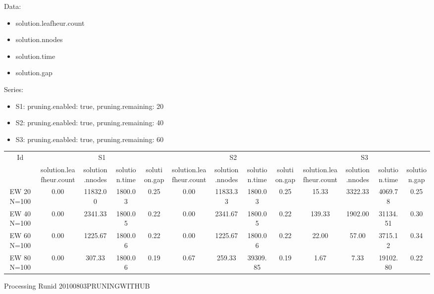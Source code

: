 \documentclass[landscape, 12pt]{report}
\begin{document}
Data:
\begin{itemize}
\item solution.leafheur.count
\item solution.nnodes
\item solution.time
\item solution.gap
\end{itemize}
Series:
\begin{itemize}
\item S1: pruning.enabled: true, pruning.remaining: 20
\item S2: pruning.enabled: true, pruning.remaining: 40
\item S3: pruning.enabled: true, pruning.remaining: 60
\end{itemize}
\begin{tabular}{|c|cccc|cccc|cccc|}
\hline
\multicolumn{1}{|c|}{Id} & \multicolumn{4}{|c|}{S1} & \multicolumn{4}{|c|}{S2} & \multicolumn{4}{|c|}{S3}
\\
 & solution.leafheur.count & solution.nnodes & solution.time & solution.gap & solution.leafheur.count & solution.nnodes & solution.time & solution.gap & solution.leafheur.count & solution.nnodes & solution.time & solution.gap
\\
\hline
EW 20 N=100 & 0.00 & 11832.00 & 1800.03 & 0.25 & 0.00 & 11833.33 & 1800.03 & 0.25 & 15.33 & 3322.33 & 4069.78 & 0.25
\\
EW 40 N=100 & 0.00 & 2341.33 & 1800.05 & 0.22 & 0.00 & 2341.67 & 1800.05 & 0.22 & 139.33 & 1902.00 & 31134.51 & 0.30
\\
EW 60 N=100 & 0.00 & 1225.67 & 1800.06 & 0.22 & 0.00 & 1225.67 & 1800.06 & 0.22 & 22.00 & 57.00 & 3715.12 & 0.34
\\
EW 80 N=100 & 0.00 & 307.33 & 1800.06 & 0.19 & 0.67 & 259.33 & 39309.85 & 0.19 & 1.67 & 7.33 & 19102.80 & 0.22
\\
\hline 
 \end{tabular}

	
	Processing Runid 20100803PRUNINGWITHUB
 
\end{document}

